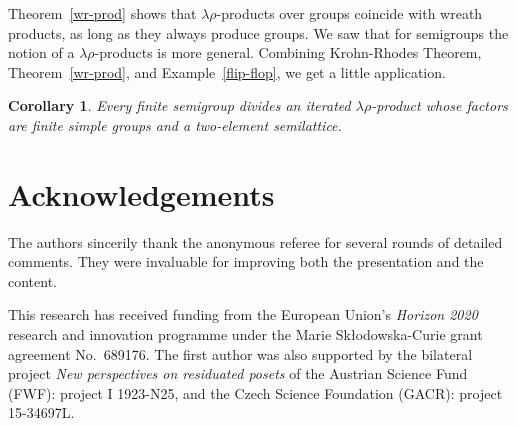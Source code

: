 \documentclass{amsart}
\newtheorem{cor}{Corollary}
\begin{document}
Theorem~\ref{wr-prod} shows that $\lambda\rho$-products over groups coincide
with wreath products, as long as they always produce groups.
We saw that for semigroups the notion of a $\lambda\rho$-products is more
general. Combining Krohn-Rhodes Theorem, Theorem~\ref{wr-prod}, and
Example~\ref{flip-flop}, we get a little application.

\begin{cor}
Every finite semigroup divides an iterated
$\lambda\rho$-product whose factors are finite simple groups and a two-element
semilattice.
\end{cor}


\section{Acknowledgements}

The authors sincerily thank the anonymous referee for several rounds of detailed
comments. They were invaluable for improving both the presentation and the
content. 

This research has received funding from the European Union’s \emph{Horizon 2020}
research and innovation programme under the Marie Skłodowska-Curie grant
agreement No.~689176. The first author was also supported by
the bilateral project \emph{New perspectives on residuated posets} of the
Austrian Science Fund (FWF): project I 1923-N25, and the Czech Science
Foundation (GACR): project 15-34697L. 

 

\begin{bibdiv}
\begin{biblist}  


\end{biblist}
\end{bibdiv}
\end{document}
